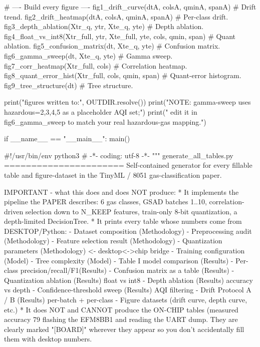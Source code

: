    # ---- Build every figure ----
    fig1_drift_curve(dtA, colsA, qminA, spanA)       # Drift trend.
    fig2_drift_heatmap(dtA, colsA, qminA, spanA)     # Per-class drift.
    fig3_depth_ablation(Xtr_q, ytr, Xte_q, yte)      # Depth ablation.
    fig4_float_vs_int8(Xtr_full, ytr, Xte_full, yte, cols, qmin, span)  # Quant ablation.
    fig5_confusion_matrix(dt, Xte_q, yte)            # Confusion matrix.
    fig6_gamma_sweep(dt, Xte_q, yte)                 # Gamma sweep.
    fig7_corr_heatmap(Xtr_full, cols)                # Correlation heatmap.
    fig8_quant_error_hist(Xtr_full, cols, qmin, span)  # Quant-error histogram.
    fig9_tree_structure(dt)                          # Tree structure.

    print("\nAll figures written to:", OUTDIR.resolve())
    print("NOTE: gamma-sweep uses hazardous={2,3,4,5} as a placeholder AQI set;")
    print("      edit it in fig6_gamma_sweep to match your real hazardous-gas mapping.")


if __name__ == "__main__":
    main()



#!/usr/bin/env python3
# -*- coding: utf-8 -*-
"""
generate_all_tables.py
======================
Self-contained generator for every fillable table and figure-dataset in the
TinyML / 8051 gas-classification paper.

IMPORTANT - what this does and does NOT produce:
  * It implements the pipeline the PAPER describes: 6 gas classes, GSAD
    batches 1..10, correlation-driven selection down to N_KEEP features,
    train-only 8-bit quantization, a depth-limited DecisionTree.
  * It prints every table whose numbers come from DESKTOP/Python:
      - Dataset composition          (Methodology)
      - Preprocessing audit          (Methodology)
      - Feature selection result     (Methodology)
      - Quantization parameters      (Methodology)  <- desktop<->chip bridge
      - Training configuration       (Model)
      - Tree complexity              (Model)
      - Table I  model comparison    (Results)
      - Per-class precision/recall/F1(Results)
      - Confusion matrix as a table  (Results)
      - Quantization ablation        (Results)  float vs int8
      - Depth ablation               (Results)  accuracy vs depth
      - Confidence-threshold sweep   (Results)  AQI filtering
      - Drift Protocol A / B         (Results)  per-batch + per-class
      - Figure datasets              (drift curve, depth curve, etc.)
  * It does NOT and CANNOT produce the ON-CHIP tables (measured accuracy
    79%
    flashing the EFM8BB1 and reading the UART dump. They are clearly marked
    "[BOARD]" wherever they appear so you don't accidentally fill them with
    desktop numbers.

